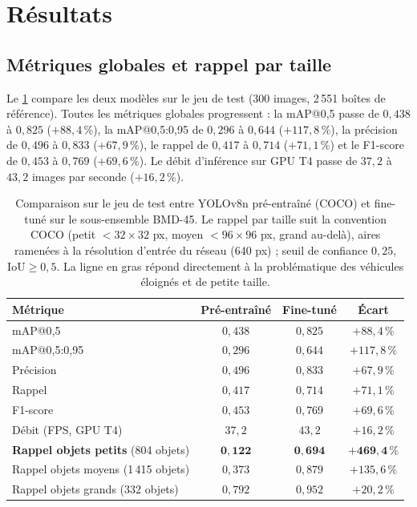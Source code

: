 \section{Résultats}\label{sec-resultats}

\subsection{Métriques globales et rappel par taille}

Le \cref{tab-comparaison} compare les deux modèles sur le jeu de test
(300 images, 2\,551 boîtes de référence). Toutes les métriques globales
progressent : la mAP@0,5 passe de $0{,}438$ à $0{,}825$ ($+88{,}4\,\%$),
la mAP@0,5:0,95 de $0{,}296$ à $0{,}644$ ($+117{,}8\,\%$), la précision
de $0{,}496$ à $0{,}833$ ($+67{,}9\,\%$), le rappel de $0{,}417$ à
$0{,}714$ ($+71{,}1\,\%$) et le F1-score de $0{,}453$ à $0{,}769$
($+69{,}6\,\%$). Le débit d'inférence sur GPU T4 passe de $37{,}2$ à
$43{,}2$ images par seconde ($+16{,}2\,\%$).

\begin{table}[tb]
  \centering
  \caption{Comparaison sur le jeu de test entre YOLOv8n pré-entraîné
  (COCO) et fine-tuné sur le sous-ensemble BMD-45. Le rappel par taille
  suit la convention COCO (petit ${}<32\times32$ px, moyen
  ${}<96\times96$ px, grand au-delà), aires ramenées à la résolution
  d'entrée du réseau (640 px) ; seuil de confiance $0{,}25$,
  $\mathrm{IoU} \geq 0{,}5$. La ligne en gras répond directement à la
  problématique des véhicules éloignés et de petite taille.}
  \label{tab-comparaison}
  \begin{tabular}{lccc}
    \toprule
    Métrique & Pré-entraîné & Fine-tuné & Écart \\
    \midrule
    mAP@0,5          & $0{,}438$ & $0{,}825$ & $+88{,}4\,\%$  \\
    mAP@0,5:0,95     & $0{,}296$ & $0{,}644$ & $+117{,}8\,\%$ \\
    Précision        & $0{,}496$ & $0{,}833$ & $+67{,}9\,\%$  \\
    Rappel           & $0{,}417$ & $0{,}714$ & $+71{,}1\,\%$  \\
    F1-score         & $0{,}453$ & $0{,}769$ & $+69{,}6\,\%$  \\
    Débit (FPS, GPU T4) & $37{,}2$ & $43{,}2$ & $+16{,}2\,\%$ \\
    \midrule
    \textbf{Rappel objets petits} (804 objets)
      & $\mathbf{0{,}122}$ & $\mathbf{0{,}694}$ & $\mathbf{+469{,}4\,\%}$ \\
    Rappel objets moyens (1\,415 objets)
      & $0{,}373$ & $0{,}879$ & $+135{,}6\,\%$ \\
    Rappel objets grands (332 objets)
      & $0{,}792$ & $0{,}952$ & $+20{,}2\,\%$  \\
    \bottomrule
  \end{tabular}
\end{table}

